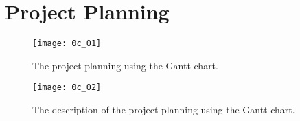\chapter{Project Planning} \label{Chapter:AppendixC}

\begin{figure}[!htb]
  \centering
  \texttt{[image: 0c\_01]}
  \caption{The project planning using the Gantt chart.}
  \label{Figure:0c_01}
\end{figure}

\begin{figure}[!htb]
  \centering
  \texttt{[image: 0c\_02]}
  \caption{The description of the project planning using the Gantt chart.}
  \label{Figure:0c_02}
\end{figure}